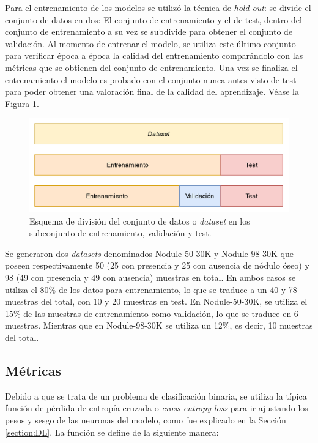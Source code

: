 Para el entrenamiento de los modelos se utilizó la técnica de \textit{hold-out}: se divide el conjunto de datos en dos: El conjunto de entrenamiento y el de test, dentro del conjunto de entrenamiento a su vez se subdivide para obtener el conjunto de validación. Al momento de entrenar el modelo, se utiliza este último conjunto para verificar época a época la calidad del entrenamiento comparándolo con las métricas que se obtienen del conjunto de entrenamiento. Una vez se finaliza el entrenamiento el modelo es probado con el conjunto nunca antes visto de test para poder obtener una valoración final de la calidad del aprendizaje. Véase la Figura \ref{fig:datasetDivide}.

\begin{figure}[h]
    \centering
    \includegraphics[width=\linewidth]{imagenes/experiments/datasetsProps.png}
    \caption[Esquema de división de datos]{Esquema de división del conjunto de datos o \textit{dataset} en los subconjunto de entrenamiento, validación y test.}
    \label{fig:datasetDivide}
\end{figure}

Se generaron dos \textit{datasets} denominados Nodule-50-30K y Nodule-98-30K que poseen respectivamente 50 (25 con presencia y 25 con ausencia de nódulo óseo) y 98 (49 con presencia y 49 con ausencia) muestras en total. En ambos casos se utiliza el 80\% de los datos para entrenamiento, lo que se traduce a un 40 y 78 muestras del total, con 10 y 20 muestras en test. En Nodule-50-30K, se utiliza el 15\% de las muestras de entrenamiento como validación, lo que se traduce en 6 muestras. Mientras que en Nodule-98-30K se utiliza un 12\%, es decir, 10 muestras del total.


\subsection{Métricas}
Debido a que se trata de un problema de clasificación binaria, se utiliza la típica función de pérdida de entropía cruzada o \textit{cross entropy loss} para ir ajustando los pesos y sesgo de las neuronas del modelo, como fue explicado en la Sección \ref{section:DL}. La función se define de la siguiente manera:

